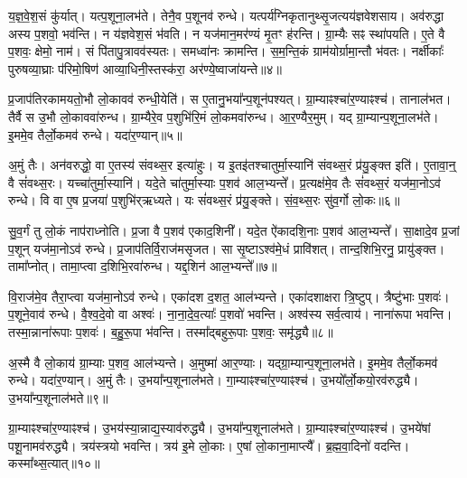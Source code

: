य॒ज्ञ॒वे॒श॒सं कु॑र्यात्।
यत्प॒शूना॒लभ॑ते।
तेनै॒व प॒शूनव॑ रुन्धे।
यत्पर्य॑ग्निकृतानुथ्सृ॒जत्य\-य॑ज्ञ\-वेशसाय।
अव॑रुद्धा अस्य प॒शवो॒ भव॑न्ति।
न य॑ज्ञवेश॒सं भ॑वति।
न यज॑मान॒मर॑ण्यं मृ॒तꣳ ह॑रन्ति।
ग्रा॒म्यैः सꣴ स्था॑पयति।
ए॒ते वै प॒शवः॒ क्षेमो॒ नाम॑।
सं पि॑तापु॒त्रावव॑स्यतः।
समध्वा॑नः क्रामन्ति।
स॒म॒न्ति॒कं ग्राम॑योर्ग्रामा॒न्तौ भ॑वतः।
नर्क्षीकाः᳚ पुरुषव्या॒घ्राः प॑रिमो॒षिण॑ आव्या॒धिनी॒स्तस्क॑रा॒ अर॑ण्ये॒ष्वाजा॑यन्ते॥४॥\ip\anuvakamend[ऋ॒तवः॑ स्यातामुथ्सृ॒जेथ्स्य॑त॒स्त्रीणि॑ च]

प्र॒जा\-प॑तिरकामयतो॒भौ लो॒कावव॑ रुन्धी॒येति॑।
स ए॒ता\-नु॒भया᳚न्प॒शून॑\-पश्यत्।
ग्रा॒म्याꣴश्चा॑\-र॒ण्याꣴश्च॑।
तानाल॑भत।
तैर्वै स उ॒भौ लो॒का\-ववा॑\-रुन्ध।
ग्रा॒म्यैरे॒व प॒शुभि॑रि॒मं लो॒कमवा॑रुन्ध।
आ॒र॒ण्यै\-र॒मुम्।
यद् ग्रा॒म्यान्प॒शूना॒लभ॑ते।
इ॒ममे॒व तैर्लो॒कमव॑ रुन्धे।
यदा॑र॒ण्यान्॥५॥\ip

अ॒मुं तैः।
अन॑वरुद्धो॒ वा ए॒तस्य॑ संवथ्स॒र इत्या॑हुः।
य इ॒तइ॑तश्चातुर्मा॒स्यानि॑ संवथ्स॒रं प्र॑यु॒ङ्क्त इति॑।
ए॒तावा॒न्॒ वै सं॑वथ्स॒रः।
यच्चा॑तुर्मा॒स्यानि॑।
यदे॒ते चा॑तुर्मा॒स्याः प॒शव॑ आल॒भ्यन्ते᳚।
प्र॒त्यक्ष॑मे॒व तैः सं॑वथ्स॒रं यज॑मा॒नो\-ऽव॑ रुन्धे।
वि वा ए॒ष प्र॒जया॑ प॒शुभि॑र्‌\mbox{}ऋध्यते।
यः सं॑वथ्स॒रं प्र॑यु॒ङ्क्ते।
सं॒व॒थ्स॒रः सु॑व॒र्गो लो॒कः॥६॥\ip

सु॒व॒र्गं तु लो॒कं नाप॑राध्नोति।
प्र॒जा वै प॒शव॑ एकाद॒शिनी᳚।
यदे॒त ऐ॑कादशि॒नाः प॒शव॑ आल॒भ्यन्ते᳚।
सा॒क्षादे॒व प्र॒जां प॒शून् यज॑मा॒नो\-ऽव॑ रुन्धे।
प्र॒जा\-प॑तिर्वि॒राज॑म\-सृजत।
सा सृ॒ष्टा\-ऽश्व॑मे॒धं प्रावि॑शत्।
तान्द॒शिभि॒रनु॒\- प्रायु॑ङ्क्त।
तामा᳚प्नोत्।
तामा॒प्त्वा द॒शिभि॒रवा॑रुन्ध।
यद्द॒शिन॑ आल॒भ्यन्ते᳚॥७॥\ip

वि॒राज॑मे॒व तैरा॒प्त्वा यज॑मा॒नो\-ऽव॑ रुन्धे।
एका॑दश द॒शत॒ आल॑भ्यन्ते।
एका॑दशाक्षरा त्रि॒ष्टुप्।
त्रैष्टु॑भाः प॒शवः॑।
प॒शूने॒वाव॑ रुन्धे।
वै॒श्व॒दे॒वो वा अश्वः॑।
ना॒ना॒दे॒व॒त्याः᳚ प॒शवो॑ भवन्ति।
अश्व॑स्य सर्व॒त्वाय॑।
नाना॑रूपा भवन्ति।
तस्मा॒न्नाना॑रूपाः प॒शवः॑।
ब॒हु॒रू॒पा भ॑वन्ति।
तस्मा᳚द्बहुरू॒पाः प॒शवः॒ समृ॑द्ध्यै॥८॥\ip\anuvakamend[आ॒र॒ण्याँल्लो॒को द॒शिन॑ आल॒भ्यन्ते॒ नाना॑रूपाः प॒शवो॒ द्वे च॑]

अ॒स्मै वै लो॒काय॑ ग्रा॒म्याः प॒शव॒ आल॑भ्यन्ते।
अ॒मुष्मा॑ आर॒ण्याः।
यद्ग्रा॒म्यान्प॒शूना॒लभ॑ते।
इ॒ममे॒व तैर्लो॒कमव॑ रुन्धे।
यदा॑र॒ण्यान्।
अ॒मुं तैः।
उ॒भया᳚न्प॒शूनाल॑भते।
गा॒म्याꣴश्चा॑र॒ण्याꣴश्च॑।
उ॒भयो᳚र्लो॒कयो॒रव॑रुद्ध्यै।
उ॒भया᳚न्प॒शूना\-ल॑भते॥९॥\ip

ग्रा॒म्याꣴश्चा॑\-र॒ण्याꣴश्च॑।
उ॒भय॑स्या॒न्नाद्य॒स्या\-व॑\-रुद्ध्यै।
उ॒भया᳚न्प॒शू\-नाल॑भते।
ग्रा॒म्याꣴश्चा॑\-र॒ण्याꣴश्च॑।
उ॒भये॑षां पशू॒नामव॑रुद्ध्यै।
त्रय॑स्त्रयो भवन्ति।
त्रय॑ इ॒मे लो॒काः।
ए॒षां लो॒काना॒माप्त्यै᳚।
ब्र॒ह्म॒वा॒दिनो॑ वदन्ति।
कस्मा᳚थ्स॒त्यात्॥१०॥\ip

